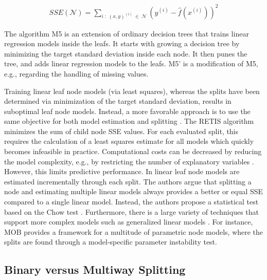 \documentclass[a4paper, 11pt]{article}
\newcommand{\Node}{\mathcal{N}}
\begin{document}
\begin{align*}
SSE(\Node) = \sum_{i \;:\; (x, y)^{(i)} \;\in\; \Node} \left(y^{(i)} - \widehat{f}(x^{(i)})\right)^2
\end{align*}
\par
The algorithm M5 \cite{quinlan_model_tree} is an extension of ordinary decision trees that trains linear regression models inside the leafs. It starts with growing a decision tree by minimizing the target standard deviation inside each node. It then punes the tree, and adds linear regression models to the leafs. M5' \cite{wang_m5} is a modification of M5, e.g., regarding the handling of missing values.
\par
Training linear leaf node models (via least squares), whereas the splits have been determined via minimization of the target standard deviation, results in suboptimal leaf node models. Instead, a more favorable approach is to use the same objective for both model estimation and splitting \cite{zeileis_mob}. The RETIS algorithm \cite{karalic_retis} minimizes the sum of child node SSE values. For each evaluated split, this requires the calculation of a least squares estimate for all models which quickly becomes infeasible in practice. Computational costs can be decreased by reducing the model complexity, e.g., by restricting the number of explanatory variables \cite{grimshaw_treed}. However, this limits predictive performance. In \cite{potts_incremental_model_tree} linear leaf node models are estimated incrementally through each split. The authors argue that splitting a node and estimating multiple linear models always provides a better or equal SSE compared to a single linear model.
Instead, the authors propose a statistical test based on the Chow test \cite{chow_inequality_test}. Furthermore, there is a large variety of techniques that support more complex models such as generalized linear models \cite{ciampi_glm_tree, loh_guide, gama_functional_tree, zeileis_mob}. For instance, MOB provides a framework for a multitude of parametric node models, where the splits are found through a model-specific parameter instability test.

\subsection{Binary versus Multiway Splitting}
\end{document}
